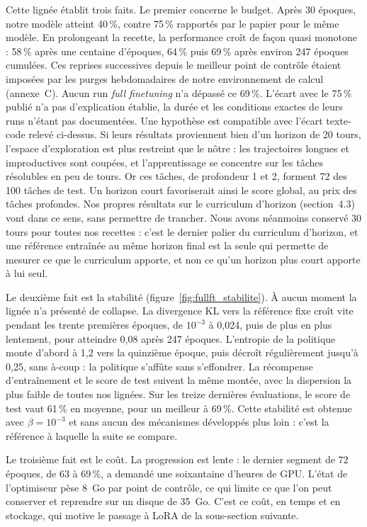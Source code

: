 \documentclass[11pt,a4paper]{article}
\begin{document}
Cette lignée établit trois faits. Le premier concerne le budget. Après 30 époques, notre modèle atteint 40\,\%, contre 75\,\% rapportés par le papier pour le même modèle. En prolongeant la recette, la performance croît de façon quasi monotone : 58\,\% après une centaine d'époques, 64\,\% puis 69\,\% après environ 247 époques cumulées. Ces reprises successives depuis le meilleur point de contrôle étaient imposées par les purges hebdomadaires de notre environnement de calcul (annexe~C). Aucun run \emph{full finetuning} n'a dépassé ce 69\,\%. L'écart avec le 75\,\% publié n'a pas d'explication établie, la durée et les conditions exactes de leurs runs n'étant pas documentées. Une hypothèse est compatible avec l'écart texte-code relevé ci-dessus. Si leurs résultats proviennent bien d'un horizon de 20 tours, l'espace d'exploration est plus restreint que le nôtre : les trajectoires longues et improductives sont coupées, et l'apprentissage se concentre sur les tâches résolubles en peu de tours. Or ces tâches, de profondeur 1 et 2, forment 72 des 100 tâches de test. Un horizon court favoriserait ainsi le score global, au prix des tâches profondes. Nos propres résultats sur le curriculum d'horizon (section~4.3) vont dans ce sens, sans permettre de trancher. Nous avons néanmoins conservé 30 tours pour toutes nos recettes : c'est le dernier palier du curriculum d'horizon, et une référence entraînée au même horizon final est la seule qui permette de mesurer ce que le curriculum apporte, et non ce qu'un horizon plus court apporte à lui seul.



Le deuxième fait est la stabilité (figure~\ref{fig:fullft_stabilite}). À aucun moment la lignée n'a présenté de collapse. La divergence KL vers la référence fixe croît vite pendant les trente premières époques, de $10^{-3}$ à 0{,}024, puis de plus en plus lentement, pour atteindre 0{,}08 après 247 époques. L'entropie de la politique monte d'abord à 1{,}2 vers la quinzième époque, puis décroît régulièrement jusqu'à 0{,}25, sans à-coup : la politique s'affûte sans s'effondrer. La récompense d'entraînement et le score de test suivent la même montée, avec la dispersion la plus faible de toutes nos lignées. Sur les treize dernières évaluations, le score de test vaut 61\,\% en moyenne, pour un meilleur à 69\,\%. Cette stabilité est obtenue avec $\beta = 10^{-3}$ et sans aucun des mécanismes développés plus loin : c'est la référence à laquelle la suite se compare.



Le troisième fait est le coût. La progression est lente : le dernier segment de 72 époques, de 63 à 69\,\%, a demandé une soixantaine d'heures de GPU. L'état de l'optimiseur pèse 8~Go par point de contrôle, ce qui limite ce que l'on peut conserver et reprendre sur un disque de 35~Go. C'est ce coût, en temps et en stockage, qui motive le passage à LoRA de la sous-section suivante.
\end{document}
